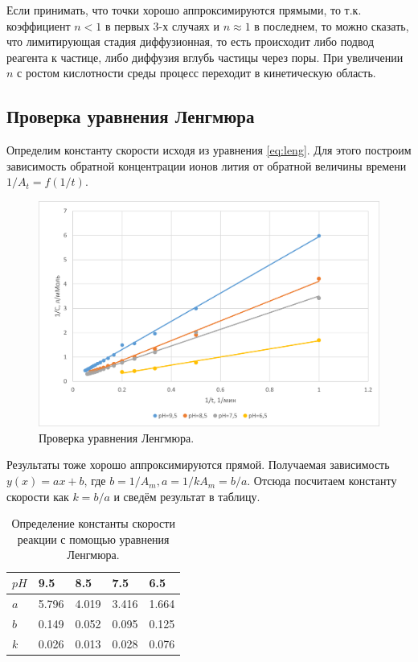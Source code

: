 \documentclass[a4paper,12pt]{article} %
\begin{document}
Если принимать, что точки хорошо аппроксимируются прямыми, то т.к. коэффициент $n<1$ в первых 3-х случаях и $n\approx1$ в последнем, то можно сказать, что лимитирующая стадия диффузионная, то есть происходит либо подвод реагента к частице, либо диффузия вглубь частицы через поры. При увеличении $n$ с ростом кислотности среды процесс переходит в кинетическую область.

\subsection{Проверка уравнения Ленгмюра}
 
Определим константу скорости исходя из уравнения \eqref{eq:leng}. Для этого построим зависимость обратной концентрации ионов лития от обратной величины времени $1/A_t=f(1/t)$. 

\begin{figure}[H]
    \centering
    \includegraphics[scale=1]{Рисунок7.png}
    \caption{Проверка уравнения Ленгмюра.
}
    \label{pic:7}
\end{figure}

Результаты тоже хорошо аппроксимируются прямой. Получаемая зависимость $y(x)=ax+b$, где $b=1/A_m, a = 1/kA_m = b/a$. Отсюда посчитаем константу скорости как $k=b/a$ и сведём результат в таблицу.

\begin{table}[H]
    \centering
    \begin{tabular}{|l|l|l|l|l|}
    \hline
        $pH$ & 9.5 & 8.5 & 7.5 & 6.5 \\ \hline
        $a$ & 5.796 & 4.019 & 3.416 & 1.664 \\ \hline
        $b$ & 0.149 & 0.052 & 0.095 & 0.125 \\ \hline
        $k$ & 0.026 & 0.013 & 0.028 & 0.076 \\ \hline
    \end{tabular}
    \caption{Определение константы скорости реакции с помощью уравнения Ленгмюра.}
    \label{tab:7}
\end{table}
\end{document}

